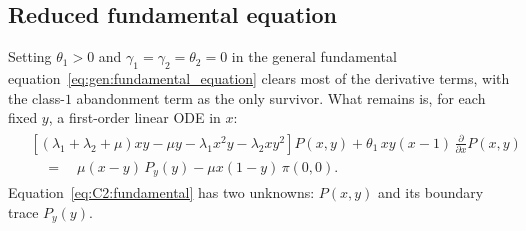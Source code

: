 \subsection{Reduced fundamental equation}\label{ssec:C2:reduction}


Setting $\theta_1>0$ and $\gamma_1=\gamma_2=\theta_2=0$ in the general fundamental equation~\eqref{eq:gen:fundamental_equation} clears most of the derivative terms, with the class-$1$ abandonment term as the only survivor. What remains is, for each fixed $y$, a first-order linear ODE in $x$:
\begin{align}
    \begin{split}
     &\left[ (\lambda_1+\lambda_2+\mu)xy - \mu y - \lambda_1 x^2 y - \lambda_2 x y^2 \right] P(x,y)
    + \theta_1\, xy(x-1)\,\frac{\partial}{\partial x} P(x,y) \\
   &\quad=\quad \mu (x-y)\,P_y(y) - \mu x(1-y)\,\pi(0,0).
    \label{eq:C2:fundamental}
    \end{split}
\end{align}
Equation~\eqref{eq:C2:fundamental} has two unknowns: $P(x,y)$ and its boundary trace $P_y(y)$.

